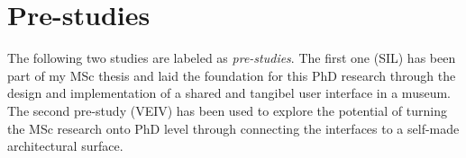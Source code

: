 \begin{table}[h!]
\centering
{}
\caption[Overview of conducted design studies]{Overview of conducted design studies including the types of electronic surfaces.}
\label{summary_study}
\end{table}




\section{Pre-studies}

The following two studies are labeled as \textit{pre-studies}. The first one (SIL) has been part of my MSc thesis and laid the foundation for this PhD research through the design and implementation of a shared and tangibel user interface in a museum. The second pre-study (VEIV) has been used to explore the potential of turning the MSc research onto PhD level through connecting the interfaces to a self-made architectural surface.

